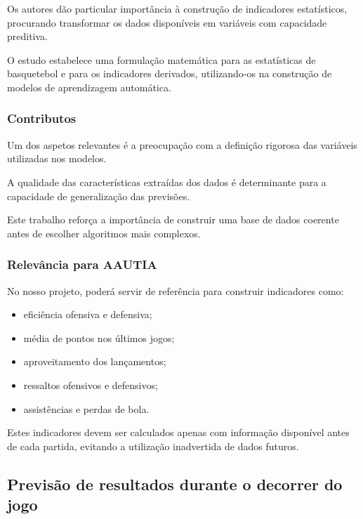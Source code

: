 Os autores dão particular importância à construção de indicadores
estatísticos, procurando transformar os dados disponíveis em variáveis
com capacidade preditiva.

O estudo estabelece uma formulação matemática para as estatísticas de
basquetebol e para os indicadores derivados, utilizando-os na construção
de modelos de aprendizagem automática.

\subsubsection{Contributos}\label{aautia:contributos}

Um dos aspetos relevantes é a preocupação com a definição rigorosa das
variáveis utilizadas nos modelos.

A qualidade das características extraídas dos dados é determinante para
a capacidade de generalização das previsões.

Este trabalho reforça a importância de construir uma base de dados
coerente antes de escolher algoritmos mais complexos.

\subsubsection{Relevância para
AAUTIA}\label{aautia:relevuxe2ncia-para-aautia-2}

No nosso projeto, poderá servir de referência para construir indicadores
como:

\begin{itemize}
\tightlist
\item
  eficiência ofensiva e defensiva;
\item
  média de pontos nos últimos jogos;
\item
  aproveitamento dos lançamentos;
\item
  ressaltos ofensivos e defensivos;
\item
  assistências e perdas de bola.
\end{itemize}

Estes indicadores devem ser calculados apenas com informação disponível
antes de cada partida, evitando a utilização inadvertida de dados
futuros.

\subsection{Previsão de resultados durante o decorrer do
jogo}\label{aautia:previsuxe3o-de-resultados-durante-o-decorrer-do-jogo}

